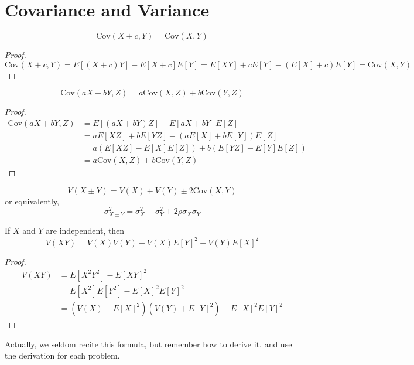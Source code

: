 \documentclass{template}
\newcommand{\Cov}{\text{Cov}}
\begin{document}
\section{Covariance and Variance}

\begin{theorem}
	\[
	\Cov(X+c, Y) = \Cov(X, Y)
	\] 
	\begin{proof}
		\[
			\Cov(X+c, Y) = E[(X+c)Y] - E[X+c]E[Y] = E[XY]+cE[Y] - (E[X]+c)E[Y] = \Cov(X, Y)
		\]
	\end{proof}
\end{theorem}

\begin{theorem}
	\[ \Cov(aX+bY, Z) = a\Cov(X, Z) + b\Cov(Y, Z) \] 
	\begin{proof}
		\[
			\begin{aligned}
				\Cov(aX+bY, Z) &= E[(aX+bY)Z] - E[aX+bY]E[Z] \\
				&= aE[XZ] + bE[YZ] - (aE[X]+bE[Y])E[Z] \\
				&= a(E[XZ]-E[X]E[Z]) + b(E[YZ]-E[Y]E[Z]) \\
				&= a\Cov(X, Z) + b\Cov(Y, Z)
				
			\end{aligned}
		\]
	\end{proof}
\end{theorem}

\begin{theorem}
	\[
		V(X\pm Y) = V(X) + V(Y) \pm 2\Cov(X, Y)
	\] 
	or equivalently,
	\[
		\sigma^2_{X\pm Y} = \sigma^2_X + \sigma^2_Y \pm 2\rho\sigma_X\sigma_Y
	\] 
\end{theorem}

\begin{theorem}
	If \( X \) and \( Y \) are independent, then
	\[
		V(XY) = V(X)V(Y) + V(X)E[Y]^2 + V(Y)E[X]^2
	\] 
		\begin{proof}
		\[
			\begin{aligned}
				V(XY) &= E[X^2Y^2] - E[XY]^2 \\
				&= E[X^2]E[Y^2] - E[X]^2E[Y]^2 \\
				&= (V(X)+E[X]^2)(V(Y)+E[Y]^2) - E[X]^2E[Y]^2
			\end{aligned}
		\]
		\end{proof}
\end{theorem}
\begin{remark}
	Actually, we seldom recite this formula, but remember how to derive it, and
	use the derivation for each problem.
\end{remark}
\end{document}
